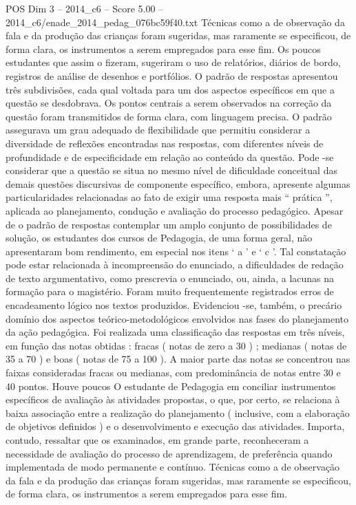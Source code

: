 \begin{textsample}{POS Dim 3 – 2014\_c6 – Score 5.00 – 2014\_c6/enade\_2014\_pedag\_076bc59f40.txt}
Técnicas como a de observação da fala e da produção das crianças foram sugeridas, mas raramente se especificou, de forma clara, os instrumentos a serem empregados para esse fim.
Os poucos estudantes que assim o fizeram, sugeriram o uso de relatórios, diários de bordo, registros de análise de desenhos e portfólios.
O padrão de respostas apresentou três subdivisões, cada qual voltada para um dos aspectos específicos em que a questão se desdobrava.
Os pontos centrais a serem observados na correção da questão foram transmitidos de forma clara, com linguagem precisa.
O padrão assegurava um grau adequado de flexibilidade que permitiu considerar a diversidade de reflexões encontradas nas respostas, com diferentes níveis de profundidade e de especificidade em relação ao conteúdo da questão.
Pode -se considerar que a questão se situa no mesmo nível de dificuldade conceitual das demais questões discursivas de componente específico, embora, apresente algumas particularidades relacionadas ao fato de exigir uma resposta mais “ prática ”, aplicada ao planejamento, condução e avaliação do processo pedagógico.
Apesar de o padrão de respostas contemplar um amplo conjunto de possibilidades de solução, os estudantes dos cursos de Pedagogia, de uma forma geral, não apresentaram bom rendimento, em especial nos itens ‘ a ’ e ‘ c ’.
Tal constatação pode estar relacionada à incompreensão do enunciado, a dificuldades de redação de texto argumentativo, como prescrevia o enunciado, ou, ainda, a lacunas na formação para o magistério.
Foram muito frequentemente registrados erros de encadeamento lógico nos textos produzidos.
Evidenciou -se, também, o precário domínio dos aspectos teórico-metodológicos envolvidos nas fases do planejamento da ação pedagógica.
Foi realizada uma classificação das respostas em três níveis, em função das notas obtidas : fracas ( notas de zero a 30 ) ; medianas ( notas de 35 a 70 ) e boas ( notas de 75 a 100 ).
A maior parte das notas se concentrou nas faixas consideradas fracas ou medianas, com predominância de notas entre 30 e 40 pontos.
Houve poucos O estudante de Pedagogia em conciliar instrumentos específicos de avaliação às atividades propostas, o que, por certo, se relaciona à baixa associação entre a realização do planejamento ( inclusive, com a elaboração de objetivos definidos ) e o desenvolvimento e execução das atividades.
Importa, contudo, ressaltar que os examinados, em grande parte, reconheceram a necessidade de avaliação do processo de aprendizagem, de preferência quando implementada de modo permanente e contínuo.
Técnicas como a de observação da fala e da produção das crianças foram sugeridas, mas raramente se especificou, de forma clara, os instrumentos a serem empregados para esse fim.

\end{textsample}
